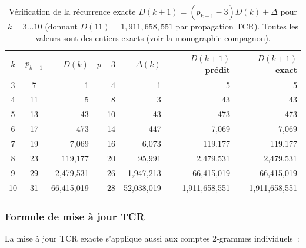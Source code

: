 \documentclass[12pt,a4paper]{article}
\begin{document}
\begin{table}[htbp]
\centering
\caption{Vérification de la récurrence exacte $D(k+1) = (p_{k+1}-3)D(k) + \Delta$
pour $k = 3\ldots 10$ (donnant $D(11) = 1{,}911{,}658{,}551$ par propagation TCR).
Toutes les valeurs sont des entiers exacts (voir la monographie compagnon).}
\label{tab:recurrence_check}
\begin{tabular}{ccrrrrr}
\toprule
$k$ & $p_{k+1}$ & $D(k)$ & $p-3$ & $\Delta(k)$ & $D(k+1)$ prédit & $D(k+1)$ exact \\
\midrule
 3 &  7 & 1             & 4  & 1             & 5              & 5 \\
 4 & 11 & 5             & 8  & 3             & 43             & 43 \\
 5 & 13 & 43            & 10 & 43            & 473            & 473 \\
 6 & 17 & 473           & 14 & 447           & 7{,}069        & 7{,}069 \\
 7 & 19 & 7{,}069       & 16 & 6{,}073       & 119{,}177      & 119{,}177 \\
 8 & 23 & 119{,}177     & 20 & 95{,}991      & 2{,}479{,}531  & 2{,}479{,}531 \\
 9 & 29 & 2{,}479{,}531 & 26 & 1{,}947{,}213 & 66{,}415{,}019 & 66{,}415{,}019 \\
10 & 31 & 66{,}415{,}019 & 28 & 52{,}038{,}019 & 1{,}911{,}658{,}551 & 1{,}911{,}658{,}551 \\
\bottomrule
\end{tabular}
\end{table}

\subsubsection{Formule de mise à jour TCR}

La mise à jour TCR exacte s'applique aussi aux comptes 2-grammes
individuels~:
\end{document}

